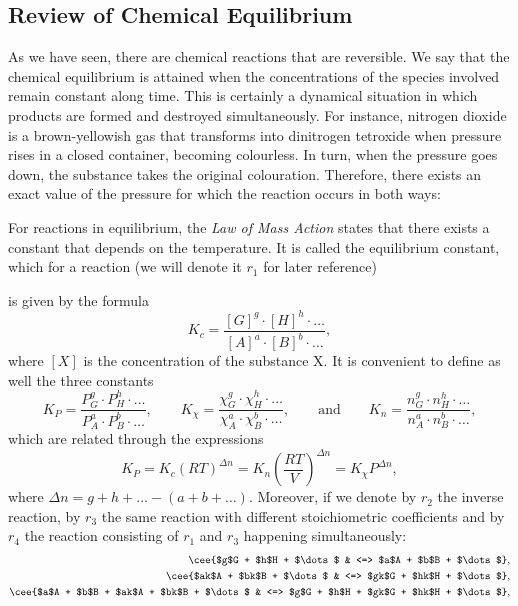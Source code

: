 \documentclass[a4paper,10pt]{article}
\theoremstyle{plain}
\theoremstyle{definition}
\theoremstyle{remark}
\begin{document}
\subsection{Review of Chemical Equilibrium}
As we have seen, there are chemical reactions that are reversible. We say that the chemical equilibrium is attained when the concentrations of the species involved remain constant along time. This is certainly a dynamical situation in which products are formed and destroyed simultaneously. For instance, nitrogen dioxide is a brown-yellowish gas that transforms into dinitrogen tetroxide when pressure rises in a closed container, becoming colourless. In turn, when the pressure goes down, the substance takes the original colouration. Therefore, there exists an exact value of the pressure for which the reaction occurs in both ways:
\begin{center}
\end{center}
For reactions in equilibrium, the \textit{Law of Mass Action} states that there exists a constant that depends on the temperature. It is called the equilibrium constant, which for a reaction (we will denote it $r_1$ for later reference)
\begin{center}
\end{center}
is given by the formula
\begin{equation}
K_c = \frac{[G]^g\cdot [H]^h\cdot\dots}{[A]^a\cdot [B]^b\cdot\dots},
\end{equation}
where $[X]$ is the concentration of the substance X. It is convenient to define as well the three constants
\begin{equation}
K_P = \frac{P_G^g\cdot P_H^h\cdot\dots}{P_A^a\cdot P_B^b\cdot\dots}, \qquad K_\chi = \frac{\chi_G^g\cdot\chi_H^h\cdot\dots}{\chi_A^a\cdot \chi_B^b\cdot\dots}, \qquad \text{and} \qquad K_n = \frac{n_G^g\cdot n_H^h\cdot\dots}{n_A^a\cdot n_B^b\cdot\dots},
\end{equation}
which are related through the expressions
\begin{equation}
K_P = K_c(RT)^{\Delta n} = K_n\left(\frac{RT}{V}\right)^{\Delta n} = K_\chi P^{\Delta n},
\end{equation}
where $\Delta n= g + h + \dots - (a + b + \dots)$. Moreover, if we denote by $r_2$ the inverse reaction, by $r_3$ the same reaction with different stoichiometric coefficients and by $r_4$ the reaction consisting of $r_1$ and $r_3$ happening simultaneously:
\begin{align}
\cee{$g$G + $h$H + $\dots$ & <=> $a$A + $b$B + $\dots$}, \\
\cee{$ak$A + $bk$B + $\dots$ & <=> $gk$G + $hk$H + $\dots$},\\
\cee{$a$A + $b$B + $ak$A + $bk$B + $\dots$ & <=> $g$G + $h$H + $gk$G + $hk$H + $\dots$},
\end{align}
\end{document}
